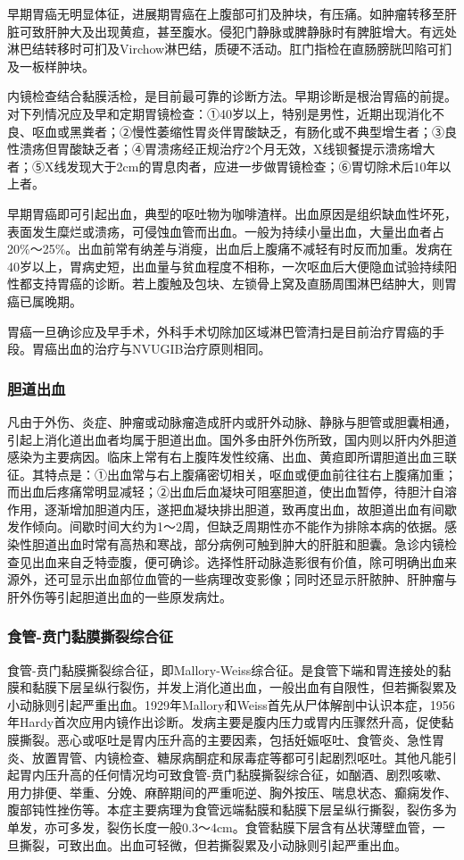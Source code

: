 早期胃癌无明显体征，进展期胃癌在上腹部可扪及肿块，有压痛。如肿瘤转移至肝脏可致肝肿大及出现黄疸，甚至腹水。侵犯门静脉或脾静脉时有脾脏增大。有远处淋巴结转移时可扪及Virchow淋巴结，质硬不活动。肛门指检在直肠膀胱凹陷可扪及一板样肿块。

内镜检查结合黏膜活检，是目前最可靠的诊断方法。早期诊断是根治胃癌的前提。对下列情况应及早和定期胃镜检查：①40岁以上，特别是男性，近期出现消化不良、呕血或黑粪者；②慢性萎缩性胃炎伴胃酸缺乏，有肠化或不典型增生者；③良性溃疡但胃酸缺乏者；④胃溃疡经正规治疗2个月无效，X线钡餐提示溃疡增大者；⑤X线发现大于2cm的胃息肉者，应进一步做胃镜检查；⑥胃切除术后10年以上者。

早期胃癌即可引起出血，典型的呕吐物为咖啡渣样。出血原因是组织缺血性坏死，表面发生糜烂或溃疡，可侵蚀血管而出血。一般为持续小量出血，大量出血者占20\%～25\%。出血前常有纳差与消瘦，出血后上腹痛不减轻有时反而加重。发病在40岁以上，胃病史短，出血量与贫血程度不相称，一次呕血后大便隐血试验持续阳性都支持胃癌的诊断。若上腹触及包块、左锁骨上窝及直肠周围淋巴结肿大，则胃癌已属晚期。

胃癌一旦确诊应及早手术，外科手术切除加区域淋巴管清扫是目前治疗胃癌的手段。胃癌出血的治疗与NVUGIB治疗原则相同。

\subsubsection{胆道出血}

凡由于外伤、炎症、肿瘤或动脉瘤造成肝内或肝外动脉、静脉与胆管或胆囊相通，引起上消化道出血者均属于胆道出血。国外多由肝外伤所致，国内则以肝内外胆道感染为主要病因。临床上常有右上腹阵发性绞痛、出血、黄疸即所谓胆道出血三联征。其特点是：①出血常与右上腹痛密切相关，呕血或便血前往往右上腹痛加重；而出血后疼痛常明显减轻；②出血后血凝块可阻塞胆道，使出血暂停，待胆汁自溶作用，逐渐增加胆道内压，遂把血凝块排出胆道，致再度出血，故胆道出血有间歇发作倾向。间歇时间大约为1～2周，但缺乏周期性亦不能作为排除本病的依据。感染性胆道出血时常有高热和寒战，部分病例可触到肿大的肝脏和胆囊。急诊内镜检查见出血来自乏特壶腹，便可确诊。选择性肝动脉造影很有价值，除可明确出血来源外，还可显示出血部位血管的一些病理改变影像；同时还显示肝脓肿、肝肿瘤与肝外伤等引起胆道出血的一些原发病灶。

\subsubsection{食管-贲门黏膜撕裂综合征}

食管-贲门黏膜撕裂综合征，即Mallory-Weiss综合征。是食管下端和胃连接处的黏膜和黏膜下层呈纵行裂伤，并发上消化道出血，一般出血有自限性，但若撕裂累及小动脉则引起严重出血。1929年Mallory和Weiss首先从尸体解剖中认识本症，1956年Hardy首次应用内镜作出诊断。发病主要是腹内压力或胃内压骤然升高，促使黏膜撕裂。恶心或呕吐是胃内压升高的主要因素，包括妊娠呕吐、食管炎、急性胃炎、放置胃管、内镜检查、糖尿病酮症和尿毒症等都可引起剧烈呕吐。其他凡能引起胃内压升高的任何情况均可致食管-贲门黏膜撕裂综合征，如酗酒、剧烈咳嗽、用力排便、举重、分娩、麻醉期间的严重呃逆、胸外按压、喘息状态、癫痫发作、腹部钝性挫伤等。本症主要病理为食管远端黏膜和黏膜下层呈纵行撕裂，裂伤多为单发，亦可多发，裂伤长度一般0.3～4cm。食管黏膜下层含有丛状薄壁血管，一旦撕裂，可致出血。出血可轻微，但若撕裂累及小动脉则引起严重出血。

